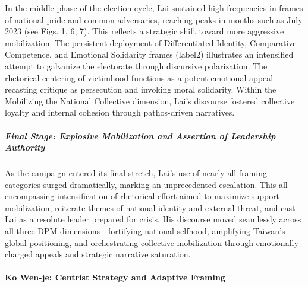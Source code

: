 \documentclass[man,12pt]{apa7}
\begin{document}
In the middle phase of the election cycle, Lai sustained high frequencies in frames of national pride and common adversaries, reaching peaks in months such as July 2023 (see Figs. 1, 6, 7). This reflects a strategic shift toward more aggressive mobilization. The persistent deployment of Differentiated Identity, Comparative Competence, and Emotional Solidarity frames (label2) illustrates an intensified attempt to galvanize the electorate through discursive polarization. The rhetorical centering of victimhood functions as a potent emotional appeal—recasting critique as persecution and invoking moral solidarity. Within the Mobilizing the National Collective dimension, Lai's discourse fostered collective loyalty and internal cohesion through pathos-driven narratives.

\subparagraph{Final Stage: Explosive Mobilization and Assertion of Leadership Authority}

As the campaign entered its final stretch, Lai's use of nearly all framing categories surged dramatically, marking an unprecedented escalation. This all-encompassing intensification of rhetorical effort aimed to maximize support mobilization, reiterate themes of national identity and external threat, and cast Lai as a resolute leader prepared for crisis. His discourse moved seamlessly across all three DPM dimensions—fortifying national selfhood, amplifying Taiwan's global positioning, and orchestrating collective mobilization through emotionally charged appeals and strategic narrative saturation.

\paragraph{Ko Wen-je: Centrist Strategy and Adaptive Framing}

\end{document}
